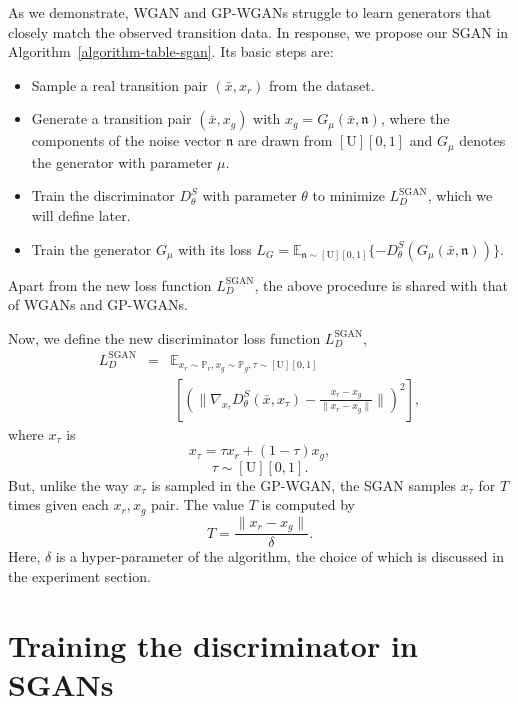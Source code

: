 \documentclass[letterpaper]{article} %
\begin{document}
As we demonstrate, WGAN and GP-WGANs struggle to learn generators that closely match the observed transition data. In response, we propose our SGAN in Algorithm~\ref{algorithm-table-sgan}. Its basic steps are:
\begin{itemize}
    \item Sample a real transition pair $(\bar{x},x_r)$ from the dataset.
    \item Generate a transition pair $(\bar{x},x_g)$ with $x_g=G_{\mu}(\bar{x},\mathfrak{n})$, where the components of the noise vector $\mathfrak{n}$ are drawn from $[\text{U}][0,1]$ and $G_{\mu}$ denotes the generator with parameter $\mu$.
    \item Train the discriminator $D^S_\theta$ with parameter $\theta$ to minimize $L^{\textrm{SGAN}}_D$, which we will define later.
    \item Train the generator $G_\mu$ with its loss $L_G=\mathbb{E}_{\mathfrak{n}\sim [\text{U}][0,1]}\{-D_{\theta}^S (G_{\mu}(\bar{x},\mathfrak{n}))\}$.
\end{itemize}

Apart from the new loss function $L^{\textrm{SGAN}}_D$, the above procedure is shared with that of WGANs and GP-WGANs.

Now, we define the new discriminator loss function $L^{\textrm{SGAN}}_D$,
\begin{eqnarray}\label{loss-d-in-sgan}
    L^{\textrm{SGAN}}_D &=& \mathbb{E}_{x_r\sim\mathbb{P}_r,x_g\sim\mathbb{P}_g,\tau\sim [\text{U}][0,1]} \nonumber\\
    && \; \left[ (\|\nabla_{x_{\tau}}D_{\theta}^S(\bar{x},x_{\tau})-\frac{x_{r}-x_{g}}{\|x_{r}-x_{g}\|}\|)^2 \right],
\end{eqnarray}
where $x_\tau$ is
\begin{equation}\label{x-tau}
 x_{\tau} = \tau x_{r} + (1-\tau) x_g,
\end{equation}
\begin{equation}\label{tau}
 \tau \sim [\text{U}][0,1].
\end{equation}
But, unlike the way $x_\tau$ is sampled in the GP-WGAN, the SGAN samples $x_\tau$ for $T$ times given each $x_r, x_g$ pair. The value $T$ is computed by
\begin{equation}\label{T-method}
    T=\frac{\|x_r-x_g\|}{\delta}.
\end{equation}
Here, $\delta$ is a hyper-parameter of the algorithm, the choice of which is discussed in the experiment section.

\section{Training the discriminator in SGANs}
\end{document}
